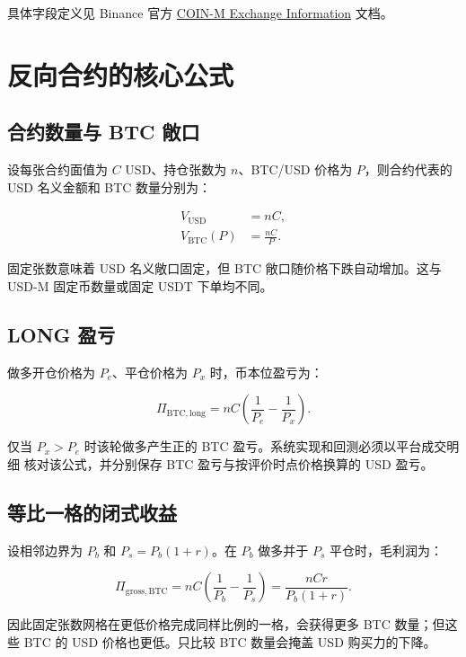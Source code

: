 \documentclass[11pt,a4paper,fontset=none]{ctexart}
\begin{document}
具体字段定义见 Binance 官方
\href{https://developers.binance.com/docs/derivatives/coin-margined-futures/market-data/rest-api/Exchange-Information}
{COIN-M Exchange Information} 文档。

\section{反向合约的核心公式}

\subsection{合约数量与 BTC 敞口}

设每张合约面值为 $C$ USD、持仓张数为 $n$、BTC/USD 价格为 $P$，则合约代表的
USD 名义金额和 BTC 数量分别为：

\begin{align}
  V_{\mathrm{USD}} &= nC,\\
  V_{\mathrm{BTC}}(P) &= \frac{nC}{P}.
\end{align}

固定张数意味着 USD 名义敞口固定，但 BTC 敞口随价格下跌自动增加。这与 USD-M
固定币数量或固定 USDT 下单均不同。

\subsection{LONG 盈亏}

做多开仓价格为 $P_e$、平仓价格为 $P_x$ 时，币本位盈亏为：

\begin{equation}
  \Pi_{\mathrm{BTC,long}}
    =nC\left(\frac{1}{P_e}-\frac{1}{P_x}\right).
\end{equation}

仅当 $P_x>P_e$ 时该轮做多产生正的 BTC 盈亏。系统实现和回测必须以平台成交明细
核对该公式，并分别保存 BTC 盈亏与按评价时点价格换算的 USD 盈亏。

\subsection{等比一格的闭式收益}

设相邻边界为 $P_b$ 和 $P_s=P_b(1+r)$。在 $P_b$ 做多并于 $P_s$ 平仓时，毛利润为：

\begin{equation}
  \Pi_{\mathrm{gross,BTC}}
  =nC\left(\frac{1}{P_b}-\frac{1}{P_s}\right)
  =\frac{nCr}{P_b(1+r)}.
\end{equation}

因此固定张数网格在更低价格完成同样比例的一格，会获得更多 BTC 数量；但这些 BTC
的 USD 价格也更低。只比较 BTC 数量会掩盖 USD 购买力的下降。
\end{document}
